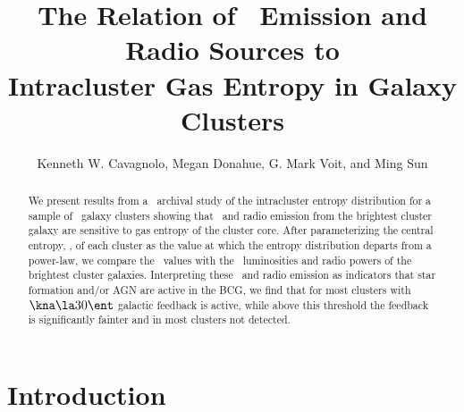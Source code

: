 \documentclass{emulateapj}
\begin{document}
\title{The Relation of \halpha\ Emission and Radio Sources to \\
  Intracluster Gas Entropy in Galaxy Clusters}
\author{
  Kenneth W. Cavagnolo,
  Megan Donahue,
  G. Mark Voit, 
  and Ming Sun}


\begin{abstract}
  We present results from a \Chandra\ archival study of the
  intracluster entropy distribution for a sample of \clnum\ galaxy
  clusters showing that \halpha\ and radio emission from the brightest
  cluster galaxy are sensitive to gas entropy of the cluster
  core. After parameterizing the central entropy, \kna, of each
  cluster as the value at which the entropy distribution departs from
  a power-law, we compare the \kna\ values with the
  \halpha\ luminosities and radio powers of the brightest cluster
  galaxies. Interpreting these \halpha\ and radio emission as
  indicators that star formation and/or AGN are active in the BCG, we
  find that for most clusters with $\kna \la 30 \ent$ galactic
  feedback is active, while above this threshold the feedback is
  significantly fainter and in most clusters not detected.
\end{abstract}


\section{Introduction}
\label{sec:intro}
\end{document}
